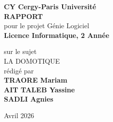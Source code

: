 
\begin{titlepage}{
    \begin{center}
        \vspace* {20mm}
        {\Large \textbf {CY Cergy-Paris Université}} \\
        \vspace* {10mm}
        {\Large \textbf {RAPPORT}} \\
        \vspace* {10mm}
        pour le projet Génie Logiciel  \\
        \textbf {Licence Informatique, 2 Année} \\
        \vspace* {10mm}

	sur le sujet \\
        \vspace* {10mm}
	{\Huge \textsf{LA DOMOTIQUE }} \\
        \vspace* {10mm}
 	rédigé par \\
        \vspace* {10mm}
        {\Large \textbf {TRAORE Mariam }} \\
        \vspace*{3mm}
        {\Large \textbf {AIT TALEB Yassine  }} \\
        \vspace*{3mm}
        {\Large \textbf {SADLI Agnies }} \\
        
				\vspace* {40mm}
				
         
       
      Avril 2026 \\
	\end{center}
}
\end{titlepage}
